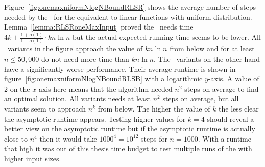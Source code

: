 Figure~\ref{fig:onemaxniformNlogNBoundRLSR} shows the average number of steps needed by the \RLSR~for the equivalent to linear functions with uniform distribution.
Lemma~\ref{lemma:RLSRoneMaxInput} proved the \RLSR~needs time $4k+\frac{1+o(1)}{1-o(1)}\cdot kn\ln n$ but the actual expected running time seems to be lower.
All \RLSR[k]~variants in the figure approach the value of $kn\ln n$ from below and for at least $n\le50,000$ do not need more time than $kn\ln n$.
The \RLSN[k]~variants on the other hand have a significantly worse performance.
Their average runtime is shown in figure~\ref{fig:onemaxniformNlogNBoundRLSB} with a logarithmic $y$-axis.
A value of 2 on the $x$-axis here means that the algorithm needed $n^2$ steps on average to find an optimal solution.
All \RLSN[k] variants needs at least $n^2$ steps on average, but all variants seem to approach $n^k$ from below.
The higher the value of $k$ the less clear the asymptotic runtime appears.
Testing higher values for $k=4$ should reveal a better view on the asymptotic runtime but if the asymptotic runtime is actually close to $n^4$ then it would take $1000^4=10^{12}$ steps for $n=1000$.
With a runtime that high it was out of this thesis time budget to test multiple runs of the \RLSN[4] with higher input sizes.
